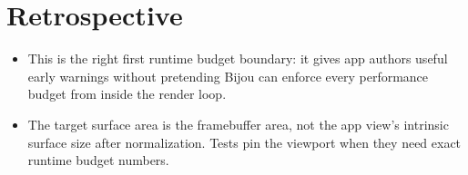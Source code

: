 \section{Retrospective}\label{record-157-retrospective}

\begin{itemize}
\tightlist
\item
  This is the right first runtime budget boundary: it gives app authors useful early warnings without pretending Bijou can enforce every performance budget from inside the render loop.
\item
  The target surface area is the framebuffer area, not the app view's intrinsic surface size after normalization. Tests pin the viewport when they need exact runtime budget numbers.
\end{itemize}

